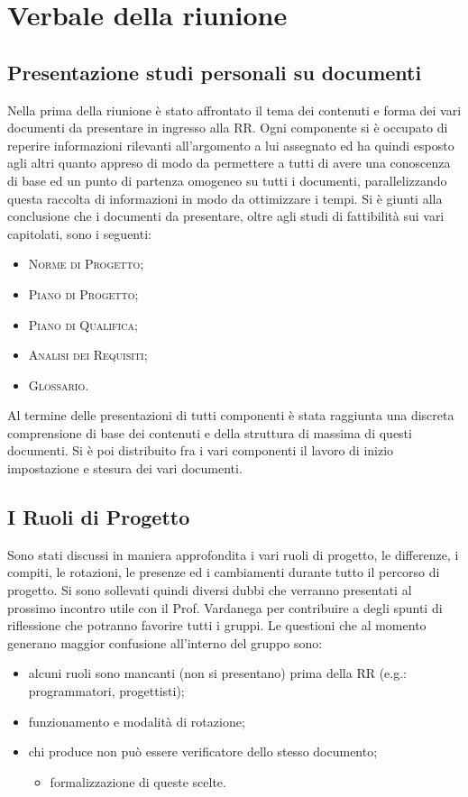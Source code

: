 \section{Verbale della riunione}
\subsection{Presentazione studi personali su documenti}
Nella prima della riunione è stato affrontato il tema dei contenuti e forma dei vari documenti da presentare in ingresso alla RR. Ogni componente si è occupato di reperire informazioni rilevanti all'argomento a lui assegnato ed ha quindi esposto agli altri quanto appreso di modo da permettere a tutti di avere una conoscenza di base ed un punto di partenza omogeneo su tutti i documenti, parallelizzando questa raccolta di informazioni in modo da ottimizzare i tempi.
Si è giunti alla conclusione che i documenti da presentare, oltre agli studi di fattibilità sui vari capitolati, sono i seguenti:
\begin{itemize}
    \item \textsc{Norme di Progetto};
    \item \textsc{Piano di Progetto};
    \item \textsc{Piano di Qualifica};
    \item \textsc{Analisi dei Requisiti};
    \item \textsc{Glossario}.
\end{itemize}
Al termine delle presentazioni di tutti componenti è stata raggiunta una discreta comprensione di base dei contenuti e della struttura di massima di questi documenti.
Si è poi distribuito fra i vari componenti il lavoro di inizio impostazione e stesura dei vari documenti.

\subsection{I Ruoli di Progetto}
Sono stati discussi in maniera approfondita i vari ruoli di progetto, le differenze, i compiti, le rotazioni, le presenze ed i cambiamenti durante tutto il percorso di progetto. Si sono sollevati quindi diversi dubbi che verranno presentati al prossimo incontro utile con il Prof. Vardanega per contribuire a degli spunti di riflessione che potranno favorire tutti i gruppi. Le questioni che al momento generano maggior confusione all'interno del gruppo sono:
\begin{itemize}
    \item alcuni ruoli sono mancanti (non si presentano) prima della RR (e.g.: programmatori, progettisti);
    \item funzionamento e modalità di rotazione;
    \item chi produce non può essere verificatore dello stesso documento;
    \begin{itemize}
        \item formalizzazione di queste scelte.
    \end{itemize}
\end{itemize}

